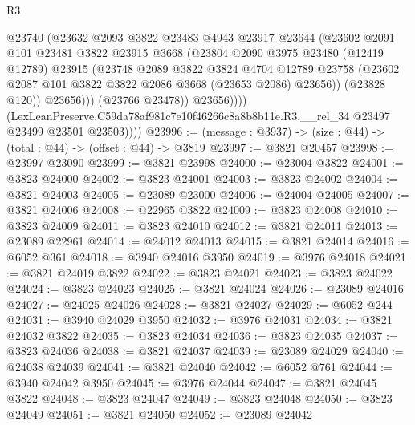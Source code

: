 \begin{lexlean}{R3}
\begin{coremodule}
                      @23740
                      (@23632
                        @2093
                        @3822
                        @23483
                        @4943
                        @23917
                        @23644
                        (@23602
                          @2091
                          @101
                          @23481
                          @3822
                          @23915
                          @3668
                          (@23804
                            @2090
                            @3975
                            @23480
                            (@12419 @12789)
                            @23915
                            (@23748
                              @2089
                              @3822
                              @3824
                              @4704
                              @12789
                              @23758
                              (@23602 @2087 @101 @3822 @3822 @2086 @3668 (@23653 @2086) @23656))
                            (@23828 @120))
                          @23656)))
                    (@23766 @23478))
                  @23656))))
          (LexLeanPreserve.C59da78af981c7e10f46266c8a8b8b11e.R3.__rel_34
            @23497
            @23499
            @23501
            @23503))))
@23996 := (message : @3937) -> (size : @44) -> (total : @44) -> (offset : @44) -> @3819
@23997 := @3821 @20457
@23998 := @23997 @23090
@23999 := @3821 @23998
@24000 := @23004 @3822
@24001 := @3823 @24000
@24002 := @3823 @24001
@24003 := @3823 @24002
@24004 := @3821 @24003
@24005 := @23089 @23000
@24006 := @24004 @24005
@24007 := @3821 @24006
@24008 := @22965 @3822
@24009 := @3823 @24008
@24010 := @3823 @24009
@24011 := @3823 @24010
@24012 := @3821 @24011
@24013 := @23089 @22961
@24014 := @24012 @24013
@24015 := @3821 @24014
@24016 := @6052 @361
@24018 := @3940 @24016 @3950
@24019 := @3976 @24018
@24021 := @3821 @24019 @3822
@24022 := @3823 @24021
@24023 := @3823 @24022
@24024 := @3823 @24023
@24025 := @3821 @24024
@24026 := @23089 @24016
@24027 := @24025 @24026
@24028 := @3821 @24027
@24029 := @6052 @244
@24031 := @3940 @24029 @3950
@24032 := @3976 @24031
@24034 := @3821 @24032 @3822
@24035 := @3823 @24034
@24036 := @3823 @24035
@24037 := @3823 @24036
@24038 := @3821 @24037
@24039 := @23089 @24029
@24040 := @24038 @24039
@24041 := @3821 @24040
@24042 := @6052 @761
@24044 := @3940 @24042 @3950
@24045 := @3976 @24044
@24047 := @3821 @24045 @3822
@24048 := @3823 @24047
@24049 := @3823 @24048
@24050 := @3823 @24049
@24051 := @3821 @24050
@24052 := @23089 @24042

\end{coremodule}
\end{lexlean}
